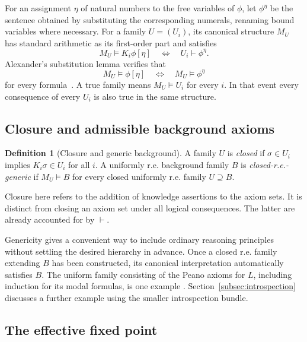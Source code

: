 \documentclass[11pt]{article}
\theoremstyle{definition}
\newtheorem{definition}[theorem]{Definition}
\begin{document}
For an assignment $\eta$ of natural numbers to the free variables of $\phi$,
let $\phi^\eta$ be the sentence obtained by substituting the corresponding
numerals, renaming bound variables where necessary. For a family $U=(U_i)$,
its canonical structure $M_U$ has standard arithmetic as its first-order
part and satisfies
\begin{equation}\label{eq:canonical}
 M_U\models K_i\phi[\eta]
 \quad\Longleftrightarrow\quad U_i\vdash\phi^\eta.
\end{equation}
Alexander's substitution lemma verifies that
\begin{equation}\label{eq:substitution}
 M_U\models\phi[\eta]
 \quad\Longleftrightarrow\quad M_U\models\phi^\eta
\end{equation}
for every formula~\cite[Lemma~8]{alexander}. A true family means
$M_U\models U_i$ for every $i$. In that event every consequence of every
$U_i$ is also true in the same structure.

\subsection{Closure and admissible background axioms}

\begin{definition}[Closure and generic background]\label{def:generic}
A family $U$ is \emph{closed} if $\sigma\in U_i$ implies
$K_i\sigma\in U_i$ for all $i$. A uniformly r.e. background family $B$ is
\emph{closed-r.e.-generic} if $M_U\models B$ for every closed uniformly r.e.
family $U\supseteq B$.
\end{definition}

Closure here refers to the addition of knowledge assertions to the axiom
sets. It is distinct from closing an axiom set under all logical
consequences. The latter are already accounted for by $\vdash$.

Genericity gives a convenient way to include ordinary reasoning principles
without settling the desired hierarchy in advance. Once a closed r.e.
family extending $B$ has been constructed, its canonical interpretation
automatically satisfies $B$. The uniform family consisting of the Peano
axioms for $L$, including induction for its modal formulas, is one example
\cite[Lemmas~10 and~20]{alexander}. Section~\ref{subsec:introspection}
discusses a further example using the smaller introspection bundle.

\subsection{The effective fixed point}\label{subsec:fixed-point}
\end{document}
